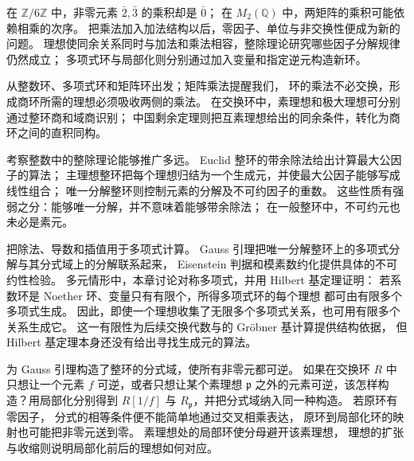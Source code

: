 
\BookPartGuide
在 \(\mathbb Z/6\mathbb Z\) 中，非零元素 \(\bar2,\bar3\) 的乘积却是 \(\bar0\)； 在 \(M_2(\mathbb Q)\) 中，两矩阵的乘积可能依赖相乘的次序。 把乘法加入加法结构以后，零因子、单位与非交换性便成为新的问题。 理想使同余关系同时与加法和乘法相容，整除理论研究哪些因子分解规律仍然成立； 多项式环与局部化则分别通过加入变量和指定逆元构造新环。

\ProseParagraphBreak
{}从整数环、多项式环和矩阵环出发；矩阵乘法提醒我们， 环的乘法不必交换，形成商环所需的理想必须吸收两侧的乘法。 在交换环中，素理想和极大理想可分别通过整环商和域商识别； 中国剩余定理则把互素理想给出的同余条件，转化为商环之间的直积同构。

\ProseParagraphBreak
{}考察整数中的整除理论能够推广多远。 Euclid 整环的带余除法给出计算最大公因子的算法； 主理想整环把每个理想归结为一个生成元，并使最大公因子能够写成线性组合； 唯一分解整环则控制元素的分解及不可约因子的重数。 这些性质有强弱之分：能够唯一分解，并不意味着能够带余除法； 在一般整环中，不可约元也未必是素元。

\ProseParagraphBreak
{}把除法、导数和插值用于多项式计算。 Gauss 引理把唯一分解整环上的多项式分解与其分式域上的分解联系起来， Eisenstein 判据和模素数约化提供具体的不可约性检验。 多元情形中，本章讨论对称多项式，并用 Hilbert 基定理证明： 若系数环是 Noether 环、变量只有有限个，所得多项式环的每个理想 都可由有限多个多项式生成。 因此，即使一个理想收集了无限多个多项式关系，也可用有限多个关系生成它。 这一有限性为后续交换代数与的 Gröbner 基计算提供结构依据， 但 Hilbert 基定理本身还没有给出寻找生成元的算法。

\ProseParagraphBreak
{}为 Gauss 引理构造了整环的分式域，使所有非零元都可逆。 如果在交换环 \(R\) 中只想让一个元素 \(f\) 可逆，或者只想让某个素理想 \(\mathfrak p\) 之外的元素可逆，该怎样构造？用局部化分别得到 \(R[1/f]\) 与 \(R_{\mathfrak p}\)，并把分式域纳入同一种构造。 若原环有零因子， 分式的相等条件便不能简单地通过交叉相乘表达， 原环到局部化环的映射也可能把非零元送到零。 素理想处的局部环使分母避开该素理想， 理想的扩张与收缩则说明局部化前后的理想如何对应。

